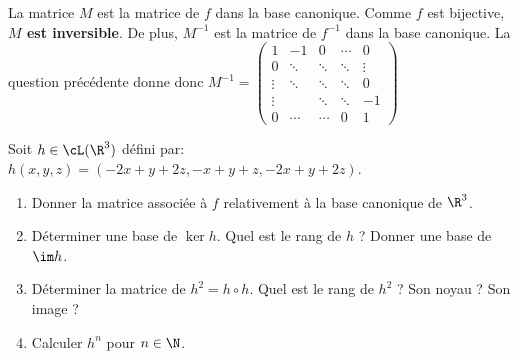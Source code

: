 \documentclass[a4paper, 11pt,reqno]{article}
\begin{document}
\begin{correction}
\begin{enumerate}
		      La matrice $M$ est la matrice de $f$ dans la base canonique. Comme $f$ est bijective, \textbf{$M$ est inversible}. De plus, $M^{-1}$ est la matrice de $f^{-1}$ dans la base canonique. La question pr\'ec\'edente donne donc $M^{-1}= \left(\begin{array}{rrrrrr} 1& -1 & 0 & \cdots&0 \\0 & \ddots& \ddots & \ddots & \vdots\\ \vdots&\ddots&\ddots&\ddots&0\\ \vdots& & \ddots & \ddots & -1\\ 0&\cdots&\cdots& 0&1        \end{array}\right)$
	\end{enumerate}
\end{correction}
\begin{exercice}  \;
	Soit $h\in\cL(\R^3)$ d\'efini par: $h(x,y,z)= ( -2x+y+2z, -x+y+z, -2x+y+2z  )$.
	\begin{enumerate}
		\item Donner la matrice associ\'ee \`a $f$ relativement \`a la base canonique de $\R^3$.
		\item D\'eterminer une base de $\ker h$. Quel est le rang de $h$ ? Donner une base de $\im h$.
		\item D\'eterminer la matrice de $h^2=h\circ h$. Quel est le rang de $h^2$ ? Son noyau ? Son image ?
		\item Calculer $h^n$ pour $n\in\N$.
	\end{enumerate}
\end{exercice}
\end{document}
